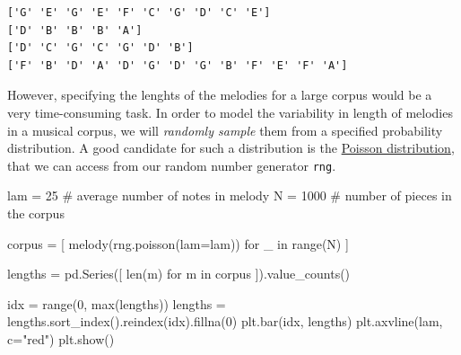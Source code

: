 \documentclass[
  a4paperpaper,
  ,captions=tableheading
]{scrbook}
\newenvironment{Shaded}{\begin{snugshade}}{\end{snugshade}}
\newcommand{\BuiltInTok}[1]{\textcolor[rgb]{0.00,0.23,0.31}{#1}}
\newcommand{\CommentTok}[1]{\textcolor[rgb]{0.37,0.37,0.37}{#1}}
\newcommand{\ControlFlowTok}[1]{\textcolor[rgb]{0.00,0.23,0.31}{#1}}
\newcommand{\DecValTok}[1]{\textcolor[rgb]{0.68,0.00,0.00}{#1}}
\newcommand{\KeywordTok}[1]{\textcolor[rgb]{0.00,0.23,0.31}{#1}}
\newcommand{\NormalTok}[1]{\textcolor[rgb]{0.00,0.23,0.31}{#1}}
\newcommand{\OperatorTok}[1]{\textcolor[rgb]{0.37,0.37,0.37}{#1}}
\newcommand{\StringTok}[1]{\textcolor[rgb]{0.13,0.47,0.30}{#1}}
\begin{document}
\begin{verbatim}
['G' 'E' 'G' 'E' 'F' 'C' 'G' 'D' 'C' 'E']
['D' 'B' 'B' 'B' 'A']
['D' 'C' 'G' 'C' 'G' 'D' 'B']
['F' 'B' 'D' 'A' 'D' 'G' 'D' 'G' 'B' 'F' 'E' 'F' 'A']
\end{verbatim}

However, specifying the lenghts of the melodies for a large corpus would
be a very time-consuming task. In order to model the variability in
length of melodies in a musical corpus, we will \emph{randomly sample}
them from a specified probability distribution. A good candidate for
such a distribution is the
\href{https://en.wikipedia.org/wiki/Poisson_distribution}{Poisson
distribution}, that we can access from our random number generator
\texttt{rng}.

\begin{Shaded}
\begin{Highlighting}[]
\NormalTok{lam }\OperatorTok{=} \DecValTok{25} \CommentTok{\# average number of notes in melody}
\NormalTok{N }\OperatorTok{=} \DecValTok{1000} \CommentTok{\# number of pieces in the corpus }

\NormalTok{corpus }\OperatorTok{=}\NormalTok{ [ melody(rng.poisson(lam}\OperatorTok{=}\NormalTok{lam)) }\ControlFlowTok{for}\NormalTok{ \_ }\KeywordTok{in} \BuiltInTok{range}\NormalTok{(N) ]}

\NormalTok{lengths }\OperatorTok{=}\NormalTok{ pd.Series([ }\BuiltInTok{len}\NormalTok{(m) }\ControlFlowTok{for}\NormalTok{ m }\KeywordTok{in}\NormalTok{ corpus ]).value\_counts()}

\NormalTok{idx }\OperatorTok{=} \BuiltInTok{range}\NormalTok{(}\DecValTok{0}\NormalTok{, }\BuiltInTok{max}\NormalTok{(lengths))}
\NormalTok{lengths }\OperatorTok{=}\NormalTok{ lengths.sort\_index().reindex(idx).fillna(}\DecValTok{0}\NormalTok{)}
\NormalTok{plt.bar(idx, lengths)}
\NormalTok{plt.axvline(lam, c}\OperatorTok{=}\StringTok{"red"}\NormalTok{)}
\NormalTok{plt.show()}
\end{Highlighting}
\end{Shaded}
\end{document}
